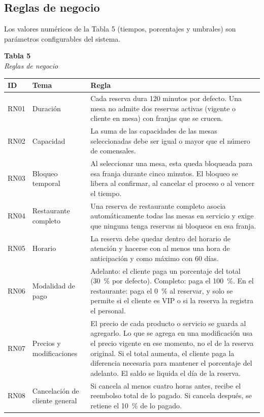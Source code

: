 \documentclass[12pt]{article}
\begin{document}
\subsection{Reglas de negocio}
Los valores num{\'e}ricos de la Tabla 5 (tiempos, porcentajes y umbrales) son par{\'a}metros configurables del sistema.
\begin{center}{\small\textbf{Tabla 5}}\\{\small\textit{Reglas de negocio}}\end{center}
\begin{longtable}{|p{1.2cm}|p{2.6cm}|>{\raggedright\arraybackslash}p{8.8cm}|}\hline
\textbf{ID} & \textbf{Tema} & \textbf{Regla}\\\hline
\endhead
RN01 & Duraci{\'o}n & Cada reserva dura 120 minutos por defecto. Una mesa no admite dos reservas activas (vigente o cliente en mesa) con franjas que se crucen.\\\hline
RN02 & Capacidad & La suma de las capacidades de las mesas seleccionadas debe ser igual o mayor que el n{\'u}mero de comensales.\\\hline
RN03 & Bloqueo temporal & Al seleccionar una mesa, esta queda bloqueada para esa franja durante cinco minutos. El bloqueo se libera al confirmar, al cancelar el proceso o al vencer el tiempo.\\\hline
RN04 & Restaurante completo & Una reserva de restaurante completo asocia autom{\'a}ticamente todas las mesas en servicio y exige que ninguna tenga reservas ni bloqueos en esa franja.\\\hline
RN05 & Horario & La reserva debe quedar dentro del horario de atenci{\'o}n y hacerse con al menos una hora de anticipaci{\'o}n y como m{\'a}ximo con 60 d{\'i}as.\\\hline
RN06 & Modalidad de pago & Adelanto: el cliente paga un porcentaje del total (30~\% por defecto). Completo: paga el 100~\%. En el restaurante: paga el 0~\% al reservar, y solo se permite si el cliente es VIP o si la reserva la registra el personal.\\\hline
RN07 & Precios y modificaciones & El precio de cada producto o servicio se guarda al agregarlo. Lo que se agrega en una modificaci{\'o}n usa el precio vigente en ese momento, no el de la reserva original. Si el total aumenta, el cliente paga la diferencia necesaria para mantener el porcentaje del adelanto. El saldo se liquida el d{\'i}a de la reserva.\\\hline
RN08 & Cancelaci{\'o}n de cliente general & Si cancela al menos cuatro horas antes, recibe el reembolso total de lo pagado. Si cancela despu{\'e}s, se retiene el 10~\% de lo pagado.\\\hline

\end{longtable}
\end{document}
